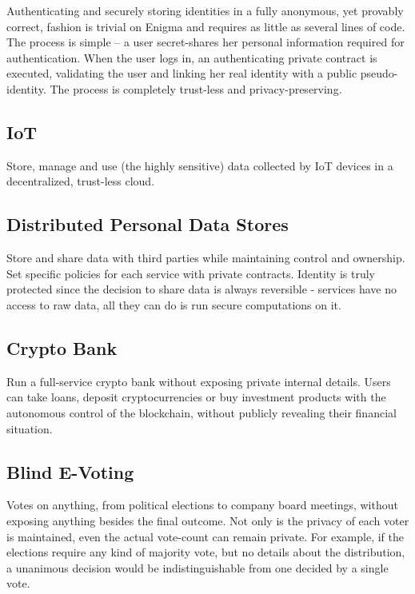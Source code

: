 \documentclass{article} \usepackage{nips13submit_e,times}
\begin{document}
Authenticating and securely storing identities in a fully anonymous, yet provably correct, fashion is trivial on Enigma and requires as little as several lines of code. The process is simple -- a user secret-shares her personal information required for authentication. When the user logs in, an authenticating private contract is executed, validating the user and linking her real identity with a public pseudo-identity. The process is completely trust-less and privacy-preserving.

\subsection{IoT}

Store, manage and use (the highly sensitive) data collected by IoT devices in a decentralized, trust-less cloud.




\subsection{Distributed Personal Data Stores}

Store and share data with third parties while maintaining control and ownership. Set specific policies for each service with private contracts. Identity is truly protected since the decision to share data is always reversible - services have no access to raw data, all they can do is run secure computations on it. 

\subsection{Crypto Bank}

Run a full-service crypto bank without exposing private internal details. Users can take loans, deposit cryptocurrencies or buy investment products with the autonomous control of the blockchain, without publicly revealing their financial situation.

\subsection{Blind E-Voting}

Votes on anything, from political elections to company board meetings, without exposing anything besides the final outcome. Not only is the privacy of each voter is maintained, even the actual vote-count can remain private. For example, if the elections require any kind of majority vote, but no details about the distribution, a unanimous decision would be indistinguishable from one decided by a single vote.
\end{document}
